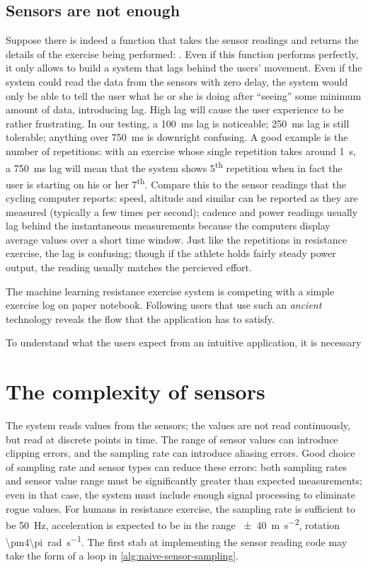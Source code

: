 \subsection{Sensors are not enough}
Suppose there is indeed a function that takes the sensor readings and returns the details of the exercise being performed: . Even if this function performs perfectly, it only allows to build a system that lags behind the users' movement. Even if the system could read the data from the sensors with zero delay, the system would only be able to tell the user what he or she is doing after ``seeing'' some minimum amount of data, introducing lag. High lag will cause the user experience to be rather frustrating. In our testing, a \SI{100}{\milli\second} lag is noticeable; \SI{250}{\milli\second} lag is still tolerable; anything over \SI{750}{\milli\second} is downright confusing. A good example is the number of repetitions: with an exercise whose single repetition takes around \SI{1}{\second}, a \SI{750}{\milli\second} lag will mean that the system shows 5\textsuperscript{th} repetition when in fact the user is starting on his or her 7\textsuperscript{th}. Compare this to the sensor readings that the cycling computer reports: speed, altitude and similar can be reported as they are measured (typically a few times per second); cadence and power readings usually lag behind the instantaneous measurements because the computers display average values over a short time window. Just like the repetitions in resistance exercise, the lag is confusing; though if the athlete holds fairly steady power output, the reading usually matches the percieved effort.

The machine learning resistance exercise system is competing with a simple exercise log on paper notebook. Following users that use such an \emph{ancient} technology reveals the flow that the application has to satisfy. 

To understand what the users expect from an intuitive application, it is necessary

\section{The complexity of sensors}
The system reads values from the sensors; the values are not read continuously, but read at discrete points in time. The range of sensor values can introduce clipping errors, and the sampling rate can introduce aliasing errors. Good choice of sampling rate and sensor types can reduce these errors: both sampling rates and sensor value range must be significantly greater than expected measurements; even in that case, the system must include enough signal processing to eliminate rogue values. For humans in resistance exercise, the sampling rate is sufficient to be \SI{50}{\hertz}, acceleration is expected to be in the range \SI{\pm40}{\meter\second^{-2}}, rotation \SI{\pm4\pi}{\radian\second^{-1}}. The first stab at implementing the sensor reading code may take the form of a loop in \autoref{alg:naive-sensor-sampling}.

